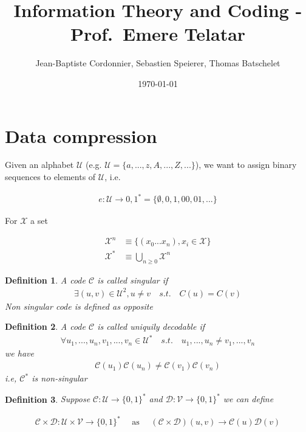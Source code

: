 \documentclass{article}
\title{Information Theory and Coding - Prof.~Emere Telatar}
\date{\today}
\author{Jean-Baptiste Cordonnier, Sebastien Speierer, Thomas Batschelet}
\newtheorem{definition}{Definition}[section]
\def\D{\mathcal{D}}
\def\V{\mathcal{V}}
\def\U{\mathcal{U}}
\def\X{\mathcal{X}}
\def\C{\mathcal{C}}
\begin{document}
\maketitle


\section{Data compression}

Given an alphabet $\U$ (e.g. $\U = \{a, ..., z, A, ..., Z, ...\}$), we want to assign binary sequences to elements of $\U$, i.e.

\begin{align*}
	e: \U \rightarrow {0, 1}^* = \{\emptyset, 0, 1, 00, 01, ...\}
\end{align*}

For $\X$ a set

\begin{align*}
	\X^n &\equiv \{ (x_0 ... x_n), x_i \in \X\} \\
	\X^* &\equiv \bigcup_{n \geq 0} \X^n
\end{align*}

\begin{definition}
	A code $\C$ is called \textit{singular} if
	\begin{align*}
		\exists (u, v) \in \U^2, u \neq v \quad s.t. \quad C(u) = C(v)
	\end{align*}
	Non singular code is defined as opposite
\end{definition}

\begin{definition}
	A code $\C$ is called \textit{uniquily decodable} if
	\begin{align*}
		\forall u_1,...,u_n,v_1,...,v_n \in \U^* \quad s.t. \quad u_1,...,u_n \neq v_1,...,v_n
	\end{align*}
	we have
	\begin{align*}
		\C(u_1) \C(u_n) \neq \C(v_1) \C(v_n)
	\end{align*}
	i.e, $\C^*$ is non-singular
\end{definition}

\begin{definition}
	Suppose $\C : \U \rightarrow \{ 0, 1\}^*$ and $\D : \V \rightarrow \{ 0, 1\}^*$ we can define

	\begin{align*}
		\C \times \D : \U \times \V \rightarrow \{0, 1\}^*
		\quad \text{ as } \quad
		(\C \times \D)(u, v) \rightarrow \C(u)\D(v)
	\end{align*}
\end{definition}
\end{document}
